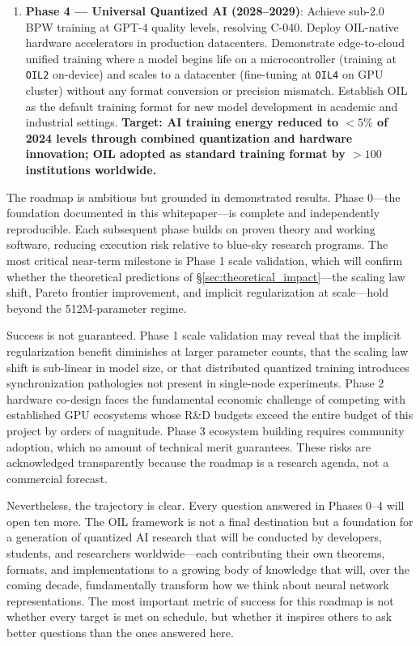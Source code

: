 \begin{enumerate}
    \item \textbf{Phase 4 --- Universal Quantized AI (2028--2029)}: Achieve sub-2.0 BPW training at GPT-4 quality levels, resolving C-040. Deploy OIL-native hardware accelerators in production datacenters. Demonstrate edge-to-cloud unified training where a model begins life on a microcontroller (training at \texttt{OIL2} on-device) and scales to a datacenter (fine-tuning at \texttt{OIL4} on GPU cluster) without any format conversion or precision mismatch. Establish OIL as the default training format for new model development in academic and industrial settings. \textbf{Target: AI training energy reduced to $< 5\%$ of 2024 levels through combined quantization and hardware innovation; OIL adopted as standard training format by $> 100$ institutions worldwide.}

\end{enumerate}

The roadmap is ambitious but grounded in demonstrated results. Phase 0---the foundation documented in this whitepaper---is complete and independently reproducible. Each subsequent phase builds on proven theory and working software, reducing execution risk relative to blue-sky research programs. The most critical near-term milestone is Phase 1 scale validation, which will confirm whether the theoretical predictions of \S\ref{sec:theoretical_impact}---the scaling law shift, Pareto frontier improvement, and implicit regularization at scale---hold beyond the 512M-parameter regime.

Success is not guaranteed. Phase 1 scale validation may reveal that the implicit regularization benefit diminishes at larger parameter counts, that the scaling law shift is sub-linear in model size, or that distributed quantized training introduces synchronization pathologies not present in single-node experiments. Phase 2 hardware co-design faces the fundamental economic challenge of competing with established GPU ecosystems whose R\&D budgets exceed the entire budget of this project by orders of magnitude. Phase 3 ecosystem building requires community adoption, which no amount of technical merit guarantees. These risks are acknowledged transparently because the roadmap is a research agenda, not a commercial forecast.

Nevertheless, the trajectory is clear. Every question answered in Phases 0--4 will open ten more. The OIL framework is not a final destination but a foundation for a generation of quantized AI research that will be conducted by developers, students, and researchers worldwide---each contributing their own theorems, formats, and implementations to a growing body of knowledge that will, over the coming decade, fundamentally transform how we think about neural network representations. The most important metric of success for this roadmap is not whether every target is met on schedule, but whether it inspires others to ask better questions than the ones answered here.

